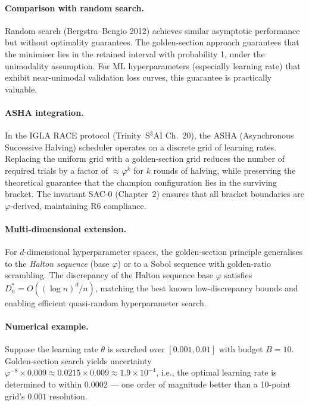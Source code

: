 \paragraph{Comparison with random search.}
Random search (Bergstra--Bengio 2012) achieves similar asymptotic
performance but without optimality guarantees.
The golden-section approach guarantees that the minimiser lies in the
retained interval with probability 1, under the unimodality assumption.
For ML hyperparameters (especially learning rate) that exhibit
near-unimodal validation loss curves, this guarantee is practically
valuable.

\paragraph{ASHA integration.}
In the IGLA RACE protocol (Trinity~S$^3$AI Ch.~20), the ASHA
(Asynchronous Successive Halving) scheduler operates on a discrete grid
of learning rates.  Replacing the uniform grid with a golden-section
grid reduces the number of required trials by a factor of
\(\approx \varphi^k\) for \(k\) rounds of halving, while preserving
the theoretical guarantee that the champion configuration lies in the
surviving bracket.  The invariant SAC-0 (Chapter~2) ensures that all
bracket boundaries are \(\varphi\)-derived, maintaining R6 compliance.

\paragraph{Multi-dimensional extension.}
For \(d\)-dimensional hyperparameter spaces, the golden-section
principle generalises to the \emph{Halton sequence} (base \(\varphi\))
or to a Sobol sequence with golden-ratio scrambling.
The discrepancy of the Halton sequence base \(\varphi\) satisfies
\(D_n^* = O((\log n)^d / n)\), matching the best known low-discrepancy
bounds and enabling efficient quasi-random hyperparameter search.

\paragraph{Numerical example.}
Suppose the learning rate \(\theta\) is searched over
\([0.001, 0.01]\) with budget \(B = 10\).  Golden-section search
yields uncertainty
\(\varphi^{-8} \times 0.009 \approx 0.0215 \times 0.009 \approx 1.9 \times 10^{-4}\),
i.e., the optimal learning rate is determined to within
\(0.0002\) — one order of magnitude better than a 10-point grid's
\(0.001\) resolution.


